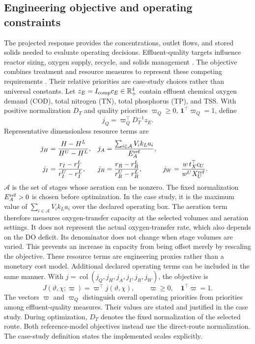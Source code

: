 \documentclass[a4paper,fleqn]{cas-sc}
\newcommand{\R}{\mathbb{R}}
\newcommand{\col}{\operatorname{col}}
\begin{document}
\subsection{Engineering objective and operating constraints}

The projected response provides the concentrations, outlet flows, and stored solids needed to evaluate operating decisions. Effluent-quality targets influence reactor sizing, oxygen supply, recycle, and solids management \citep{Henze2008}. The objective combines treatment and resource measures to represent these competing requirements \citep{Araujo2013,PadronPaez2020}. Their relative priorities are case-study choices rather than universal constants. Let $z_E=I_{\rm comp}c_E\in\R_+^4$ contain effluent chemical oxygen demand (COD), total nitrogen (TN), total phosphorus (TP), and TSS. With positive normalization $D_T$ and quality priorities $\varpi_Q\ge0$, $\mathbf1^\top\varpi_Q=1$, define
\begin{equation}
j_Q=\varpi_Q^\top D_T^{-1}z_E.
\label{eq:qualitycomponent}
\end{equation}
Representative dimensionless resource terms are
\begin{align}
j_H&=\frac{H-H^L}{H^U-H^L},&
j_A&=\frac{\sum_{i\in\mathcal A}V_i k_La_i}
{E_A^{\rm ref}},\notag\\
j_I&=\frac{r_I-r_I^L}{r_I^U-r_I^L},&
j_R&=\frac{r_R-r_R^L}{r_R^U-r_R^L},&
j_W&=\frac{w\,t_X^\top c_U}{w^UX_U^{\rm ref}}.
\label{eq:objectivecomponents}
\end{align}
$\mathcal A$ is the set of stages whose aeration can be nonzero. The fixed normalization $E_A^{\rm ref}>0$ is chosen before optimization. In the case study, it is the maximum value of $\sum_{i\in\mathcal A}V_i k_La_i$ over the declared operating box. The aeration term therefore measures oxygen-transfer capacity at the selected volumes and aeration settings. It does not represent the actual oxygen-transfer rate, which also depends on the DO deficit. Its denominator does not change when stage volumes are varied. This prevents an increase in capacity from being offset merely by rescaling the objective. These resource terms are engineering proxies rather than a monetary cost model. Additional declared operating terms can be included in the same manner. With $j=\col(j_Q,j_H,j_A,j_I,j_R,j_W)$, the objective is
\begin{equation}
J(\vartheta,\chi;\varpi)=\varpi^\top j(\vartheta,\chi),
\qquad \varpi\ge0,\quad \mathbf1^\top\varpi=1.
\label{eq:objective}
\end{equation}
The vectors $\varpi$ and $\varpi_Q$ distinguish overall operating priorities from priorities among effluent-quality measures. Their values are stated and justified in the case study. During optimization, $D_T$ denotes the fixed normalization of the selected route. Both reference-model objectives instead use the direct-route normalization. The case-study definition states the implemented scales explicitly.
\end{document}
